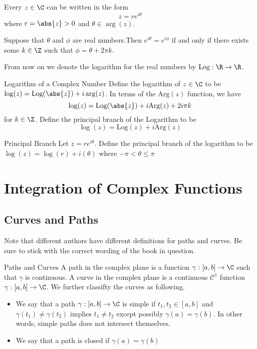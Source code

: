 \documentclass[a4paper]{article}
\begin{document}
\begin{thm}{}{} Every $z\in\C$ can be written in the form $$z=re^{i\theta}$$ where $r=\abs{z}>0$ and $\theta\in\arg(z)$. 
\end{thm}

\begin{lmm}{}{} Suppose that $\theta$ and $\phi$ are real numbers.Then $e^{i\theta}=e^{i\phi}$ if and only if there exists some $k\in\Z$ such that $\phi=\theta+2\pi k$. 
\end{lmm}

From now on we denote the logarithm for the real numbers by $\text{Log}:\R\to\R$. 

\begin{defn}{Logarithm of a Complex Number}{} Define the logarithm of $z\in\C$ to be $\log(z)=\text{Log}(\abs{z})+i\arg(z)$. In terms of the $\text{Arg}(z)$ function, we have $$\log(z)=\text{Log}(\abs{z})+i\text{Arg}(z)+2i\pi k$$ for $k\in\Z$. Define the principal branch of the Logarithm to be $$\log(z)=\text{Log}(z)+i\text{Arg}(z)$$
\end{defn}

\begin{defn}{Principal Branch}{} Let $z=re^{i\theta}$. Define the principal branch of the logarithm to be $\log(z)=\log(r)+i(\theta)$ where $-\pi<\theta\leq\pi$
\end{defn}


\pagebreak
\section{Integration of Complex Functions}
\subsection{Curves and Paths}
Note that different authors have different definitions for paths and curves. Be sure to stick with the correct wording of the book in question. 
\begin{defn}{Paths and Curves}{} A path in the complex plane is a function $\gamma:[a,b]\to\C$ such that $\gamma$ is continuous. A curve in the complex plane is a continuous $\mathcal{C}^1$ function $\gamma:[a,b]\to\C$. We further classifty the curves as following. 
\begin{itemize}
\item We say that a path $\gamma:[a,b]\to\C$ is simple if $t_1,t_2\in[a,b]$ and $\gamma(t_1)\neq\gamma(t_2)$ implies $t_1\neq t_2$ except possibly $\gamma(a)=\gamma(b)$. In other words, simple paths does not intersect themselves. 
\item We say that a path is closed if $\gamma(a)=\gamma(b)$
\end{itemize}
\end{defn}
\end{document}
